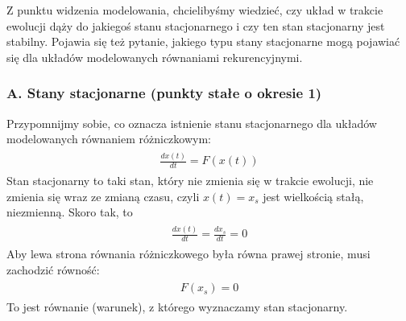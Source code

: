 \documentclass[a4paper,12pt,polish]{sphinxmanual}
\begin{document}
Z punktu widzenia modelowania,  chcielibyśmy wiedzieć, czy układ w trakcie ewolucji dąży do jakiegoś stanu stacjonarnego i czy ten stan stacjonarny jest stabilny. Pojawia się też pytanie, jakiego typu stany stacjonarne mogą pojawiać się dla układów modelowanych równaniami rekurencyjnymi.


\subsubsection{A. Stany stacjonarne (punkty stałe o okresie 1)}
\label{ch1/chI031:a-stany-stacjonarne-punkty-stale-o-okresie-1}
Przypomnijmy sobie, co oznacza istnienie stanu stacjonarnego dla układów modelowanych równaniem różniczkowym:
\label{ch1/chI031:equation-eqn6}\begin{gather}
\begin{split} \frac{dx(t)}{dt} = F(x(t))\end{split}\label{ch1/chI031-eqn6}
\end{gather}
Stan stacjonarny to taki stan, który nie zmienia się w trakcie ewolucji, nie zmienia się wraz ze zmianą czasu, czyli $x(t) = x_s$ jest wielkością stałą, niezmienną. Skoro tak, to
\label{ch1/chI031:equation-eqn7}\begin{gather}
\begin{split} \frac{dx(t)}{dt}  = \frac{dx_s}{dt}  = 0\end{split}\label{ch1/chI031-eqn7}
\end{gather}
Aby lewa strona równania różniczkowego była równa prawej stronie, musi zachodzić równość:
\label{ch1/chI031:equation-eqn8}\begin{gather}
\begin{split}F(x_s) = 0\end{split}\label{ch1/chI031-eqn8}
\end{gather}
To jest równanie (warunek), z którego wyznaczamy stan stacjonarny.
\end{document}
